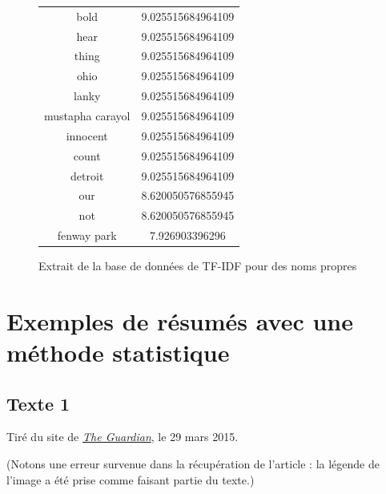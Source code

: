\documentclass[a4paper, 12pt]{article}
\begin{document}
\begin{figure}[!h]
\begin{center}
\begin{tabular}{|c|c|}
  bold  & 9.025515684964109 \\
  hear  & 9.025515684964109 \\
  thing  & 9.025515684964109 \\
  ohio  & 9.025515684964109 \\
  lanky  & 9.025515684964109 \\
  mustapha carayol  & 9.025515684964109 \\
  innocent  & 9.025515684964109 \\
  count  & 9.025515684964109 \\
  detroit  & 9.025515684964109 \\
  our  & 8.620050576855945 \\
  not  & 8.620050576855945 \\
  fenway park  & 7.926903396296 \\
  \hline
 \end{tabular}
\label{fig:TFIDFNoms}
\caption{Extrait de la base de données de TF-IDF pour des noms propres}
\end{center}
\end{figure}

\newpage
\section{Exemples de résumés avec une méthode statistique}

\subsection{Texte 1}

Tiré du site de \href{http://www.theguardian.com/football/2015/mar/29/georgia-germany-euro-2016-match-report}{\textit{The Guardian}}, le 29 mars 2015.

(Notons une erreur survenue dans la récupération de l'article : la légende de l'image a été prise comme faisant partie du texte.)
\end{document}
